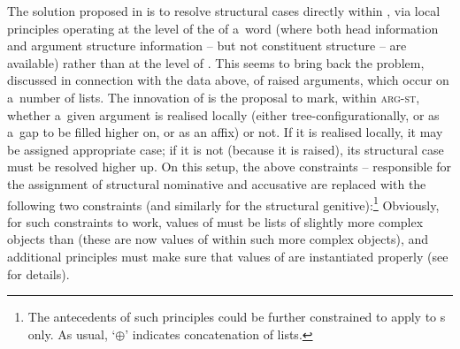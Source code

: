 \documentclass[output=paper,biblatex,babelshorthands,newtxmath,draftmode,colorlinks,citecolor=brown]{langscibook}
\begin{document}
The solution proposed in \citet{prze:96,Prze99b,Prze99} is to resolve structural cases directly
within , via local principles operating at the level of the  of a~word
(where both head information and argument structure information – but not constituent structure –
are available) rather than at the level of .  This seems to bring back the problem,
discussed in connection with the  data above, of raised arguments, which occur on
a~number of  lists.  The innovation of \citet{prze:96,Prze99b,Prze99} is the proposal
to mark, within \textsc{arg-st}, whether a~given argument is realised locally (either
tree-con\-fi\-gu\-ra\-tio\-nal\-ly, or as a~gap to be filled higher on, or as an affix) or not.  If
it is realised locally, it may be assigned appropriate case; if it is not (because it is raised),
its structural case must be resolved higher up.  On this setup, the above constraints
– responsible for the assignment of structural nominative and
accusative are replaced with the following two constraints (and similarly for the structural
genitive):\footnote{The antecedents of such principles could be further constrained to apply to
  s only. As usual, `$\oplus$' indicates concatenation of lists.} 
\ea
\label{nonc:cp:germ1}
\impl
{}
\ex \label{nonc:cp:germ2}
\z
Obviously, for such constraints to work, values of  must be lists of slightly more complex objects than  (these are now values of  within such more complex objects), and additional principles must make sure that values of  are instantiated properly (see \citealt[78–79]{Prze99b} for details).
\end{document}
